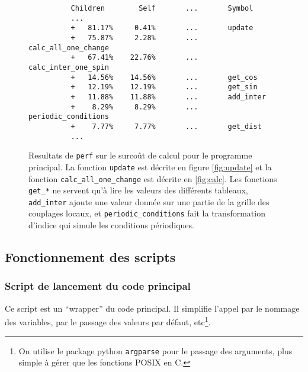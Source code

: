 \documentclass[a4paper, 11pt]{article}
\begin{document}
\begin{figure}
    \begin{center}
        \begin{verbatim}
          Children        Self       ...       Symbol
          ...
          +   81.17%     0.41%       ...       update    
          +   75.87%     2.28%       ...       calc_all_one_change
          +   67.41%    22.76%       ...       calc_inter_one_spin
          +   14.56%    14.56%       ...       get_cos
          +   12.19%    12.19%       ...       get_sin
          +   11.88%    11.88%       ...       add_inter
          +    8.29%     8.29%       ...       periodic_conditions
          +    7.77%     7.77%       ...       get_dist                 
          ...
        \end{verbatim}
    \end{center}
    \caption{Resultats de \texttt{perf} sur le surcoût de calcul pour le programme principal. La
    fonction \texttt{update} est décrite en figure \ref{fig:update} et la fonction
    \texttt{calc\_all\_one\_change} est décrite en \ref{fig:calc}. Les fonctions \texttt{get\_*} ne
    servent qu'à lire les valeurs des différents tableaux, \texttt{add\_inter} ajoute une valeur
    donnée sur une partie de la grille des couplages locaux, et \texttt{periodic\_conditions} fait
    la transformation d'indice qui simule les conditions périodiques. }
    \label{fig:perfdata}
\end{figure}

\subsection{Fonctionnement des scripts} 

\subsubsection{Script de lancement du code principal}

Ce script est un ``wrapper'' du code principal. Il simplifie l'appel par le nommage des variables, 
par le passage des valeurs par défaut, etc\footnote{On utilise le package python \texttt{argparse}
pour le passage des arguments, plus simple à gérer que les fonctions POSIX en C.}.
\end{document}
